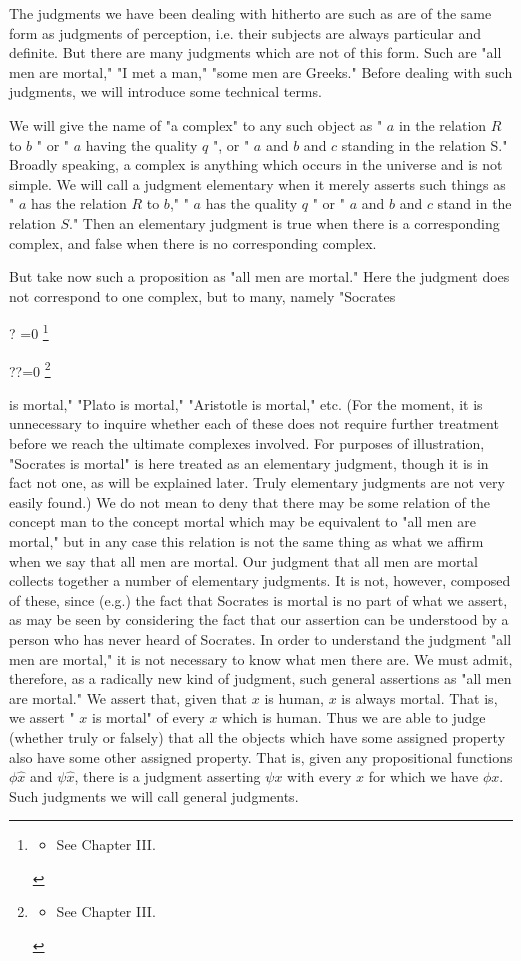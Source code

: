 \documentclass[10pt]{article}
\let\svthefootnote\thefootnote
\newcommand\blfootnotetext[1]{%
  \let\thefootnote\relax\footnote{#1}%
  \addtocounter{footnote}{-1}%
  \let\thefootnote\svthefootnote%
}
\let\svfootnotetext\footnotetext
\renewcommand\footnotetext[2][?]{%
  \if\relax#1\relax%
    \ifnum\value{footnote}=0\blfootnotetext{#2}\else\svfootnotetext{#2}\fi%
  \else%
    \if?#1\ifnum\value{footnote}=0\blfootnotetext{#2}\else\svfootnotetext{#2}\fi%
    \else\svfootnotetext[#1]{#2}\fi%
  \fi
}
\begin{document}
The judgments we have been dealing with hitherto are such as are of the same form as judgments of perception, i.e. their subjects are always particular and definite. But there are many judgments which are not of this form. Such are "all men are mortal," "I met a man," "some men are Greeks." Before dealing with such judgments, we will introduce some technical terms.

We will give the name of "a complex" to any such object as " $a$ in the relation $R$ to $b$ " or " $a$ having the quality $q$ ", or " $a$ and $b$ and $c$ standing in the relation S." Broadly speaking, a complex is anything which occurs in the universe and is not simple. We will call a judgment elementary when it merely asserts such things as " $a$ has the relation $R$ to $b$," " $a$ has the quality $q$ " or " $a$ and $b$ and $c$ stand in the relation $S$." Then an elementary judgment is true when there is a corresponding complex, and false when there is no corresponding complex.

But take now such a proposition as "all men are mortal." Here the judgment does not correspond to one complex, but to many, namely "Socrates

\footnotetext{\begin{itemize}
  \item See Chapter III.
\end{itemize}
}
is mortal," "Plato is mortal," "Aristotle is mortal," etc. (For the moment, it is unnecessary to inquire whether each of these does not require further treatment before we reach the ultimate complexes involved. For purposes of illustration, "Socrates is mortal" is here treated as an elementary judgment, though it is in fact not one, as will be explained later. Truly elementary judgments are not very easily found.) We do not mean to deny that there may be some relation of the concept man to the concept mortal which may be equivalent to "all men are mortal," but in any case this relation is not the same thing as what we affirm when we say that all men are mortal. Our judgment that all men are mortal collects together a number of elementary judgments. It is not, however, composed of these, since (e.g.) the fact that Socrates is mortal is no part of what we assert, as may be seen by considering the fact that our assertion can be understood by a person who has never heard of Socrates. In order to understand the judgment "all men are mortal," it is not necessary to know what men there are. We must admit, therefore, as a radically new kind of judgment, such general assertions as "all men are mortal." We assert that, given that $x$ is human, $x$ is always mortal. That is, we assert " $x$ is mortal" of every $x$ which is human. Thus we are able to judge (whether truly or falsely) that all the objects which have some assigned property also have some other assigned property. That is, given any propositional functions $\phi \hat{x}$ and $\psi \hat{x}$, there is a judgment asserting $\psi x$ with every $x$ for which we have $\phi x$. Such judgments we will call general judgments.
\end{document}
